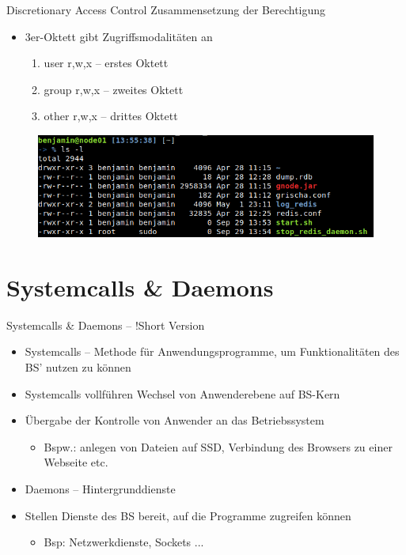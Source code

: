 \documentclass[xcolor=dvipsnames,aspectratio=169]{beamer}
\begin{document}
\begin{frame}{Discretionary Access Control}
Zusammensetzung der Berechtigung
\begin{itemize}
	\item 3er-Oktett gibt Zugriffsmodalitäten an
	\begin{enumerate}
		\item user r,w,x -- erstes Oktett
		\item group r,w,x -- zweites Oktett
		\item other r,w,x -- drittes Oktett
	\end{enumerate}
\end{itemize}
\begin{figure}
	\includegraphics[scale=0.5]{rights}
\end{figure}
\end{frame}

\section{Systemcalls \& Daemons}
\begin{frame}{Systemcalls \& Daemons -- !Short Version}
	\begin{itemize}
		\item Systemcalls -- Methode für Anwendungsprogramme, um Funktionalitäten des BS' nutzen zu können
		\item Systemcalls vollführen Wechsel von Anwenderebene auf BS-Kern 
		\item Übergabe der Kontrolle von Anwender an das Betriebssystem
		\begin{itemize}
			\item Bspw.: anlegen von Dateien auf SSD, Verbindung des Browsers zu einer Webseite etc.
		\end{itemize}
		\item Daemons -- Hintergrunddienste
		\item Stellen Dienste des BS bereit, auf die Programme zugreifen können
		\begin{itemize}
			\item Bsp: Netzwerkdienste, Sockets ...
		\end{itemize} 
	\end{itemize}
\end{frame}
\end{document}
